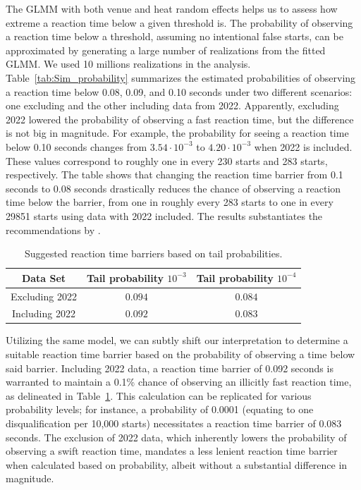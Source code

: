 \documentclass[12pt, letterpaper, titlepage]{article}
\begin{document}
The GLMM with both venue and heat random effects helps us to assess how extreme
a reaction time below a given threshold is. The probability of observing a reaction
time below a threshold, assuming no intentional false starts, can be
approximated by generating a large number of realizations from the fitted
GLMM. We used 10 millions realizations in the analysis. 
Table~\ref{tab:Sim_probability} summarizes the estimated probabilities of
observing a reaction time below 0.08, 0.09, and 0.10 seconds under two different
scenarios: one excluding and the other including data from 2022. Apparently,
excluding 2022 lowered the probability of observing a fast reaction time, but
the difference is not big in magnitude. For example, the probability for
seeing a reaction time below 0.10 seconds changes from $3.54\cdot 10^{-3}$ to
$4.20\cdot 10^{-3}$ when 2022 is included. These values correspond to roughly one in
every 230 starts and 283 starts, respectively. The table shows that changing the
reaction time barrier from 0.1 seconds to 0.08 seconds drastically reduces the
chance of observing a reaction time below the barrier, from one in roughly every
283 starts to one in every 29851 starts using data with 2022 included. The
results substantiates the recommendations by \citet{komi2009iaaf}.


\begin{table}
  \centering
  \caption{Suggested reaction time barriers based on tail probabilities.}
  \begin{tabular}{c c c} 
   \toprule
   Data Set & Tail probability  $10^{-3}$ & Tail probability $10^{-4}$ \\ 
   \midrule
   Excluding 2022 & $0.094$ & $0.084$ \\ 
   Including 2022 & $0.092$ & $0.083$ \\
   \bottomrule
  \end{tabular}
  \label{tab:Sim_time}
\end{table}


Utilizing the same model, we can subtly shift our interpretation to determine a
suitable reaction time barrier based on the probability of observing a time
below said barrier. Including 2022 data, a reaction time barrier of 0.092
seconds is warranted to maintain a 0.1\% chance of observing an illicitly fast
reaction time, as delineated in Table~\ref{tab:Sim_time}. This calculation can
be replicated for various probability levels; for instance, a probability of
0.0001 (equating to one disqualification per 10,000 starts) necessitates a
reaction time barrier of 0.083 seconds. The exclusion of 2022 data, which
inherently lowers the probability of observing a swift reaction time, mandates a
less lenient reaction time barrier when calculated based on probability, albeit
without a substantial difference in magnitude.
\end{document}
